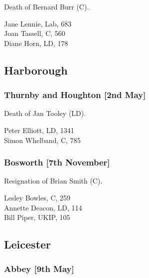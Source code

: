 \documentclass[a4paper,openany,10pt]{book}
\begin{document}

Death of Bernard Burr (C).



Jane Lennie, Lab, 683\\
Joan Tassell, C, 560\\
Diane Horn, LD, 178\\


\subsection*{Harborough}

\subsubsection*{Thurnby and Houghton \hspace*{\fill}\nolinebreak[1]%
\enspace\hspace*{\fill}
[2nd May]}


Death of Jan Tooley (LD).



Peter Elliott, LD, 1341\\
Simon Whelband, C, 785\\


\subsubsection*{Bosworth \hspace*{\fill}\nolinebreak[1]%
\enspace\hspace*{\fill}
[7th November]}


Resignation of Brian Smith (C).



Lesley Bowles, C, 259\\
Annette Deacon, LD, 114\\
Bill Piper, UKIP, 105\\


\subsection*{Leicester}

\subsubsection*{Abbey \hspace*{\fill}\nolinebreak[1]%
\enspace\hspace*{\fill}
[9th May]}
\end{document}
